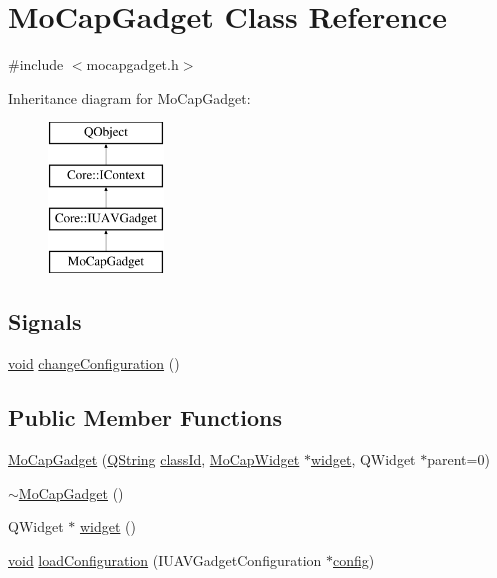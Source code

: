 \hypertarget{class_mo_cap_gadget}{\section{Mo\-Cap\-Gadget Class Reference}
\label{class_mo_cap_gadget}
}


{\ttfamily \#include $<$mocapgadget.\-h$>$}

Inheritance diagram for Mo\-Cap\-Gadget\-:\begin{figure}[H]
\begin{center}
\leavevmode
\includegraphics[height=4.000000cm]{class_mo_cap_gadget}
\end{center}
\end{figure}
\subsection*{Signals}
\begin{DoxyCompactItemize}
\item 
\hyperlink{group___u_a_v_objects_plugin_ga444cf2ff3f0ecbe028adce838d373f5c}{void} \hyperlink{group___mo_cap_plugin_gacbc122d8949ff735984095e5d5bcce1b}{change\-Configuration} ()
\end{DoxyCompactItemize}
\subsection*{Public Member Functions}
\begin{DoxyCompactItemize}
\item 
\hyperlink{group___mo_cap_plugin_ga539f5d9892beeecc36e51d97dacd3263}{Mo\-Cap\-Gadget} (\hyperlink{group___u_a_v_objects_plugin_gab9d252f49c333c94a72f97ce3105a32d}{Q\-String} \hyperlink{group___core_plugin_ga3878fde66a57220608960bcc3fbeef2c}{class\-Id}, \hyperlink{class_mo_cap_widget}{Mo\-Cap\-Widget} $\ast$\hyperlink{group___mo_cap_plugin_ga10e2501808e097eccf87a35bc8111c20}{widget}, Q\-Widget $\ast$parent=0)
\item 
\hyperlink{group___mo_cap_plugin_gabcb6599fae9fd93655a6f2c9d72f13e0}{$\sim$\-Mo\-Cap\-Gadget} ()
\item 
Q\-Widget $\ast$ \hyperlink{group___mo_cap_plugin_ga10e2501808e097eccf87a35bc8111c20}{widget} ()
\item 
\hyperlink{group___u_a_v_objects_plugin_ga444cf2ff3f0ecbe028adce838d373f5c}{void} \hyperlink{group___mo_cap_plugin_ga3ec1dcb97187294b0436fd7a0e5532d1}{load\-Configuration} (I\-U\-A\-V\-Gadget\-Configuration $\ast$\hyperlink{deflate_8c_a4473b5227787415097004fd39f55185e}{config})
\end{DoxyCompactItemize}
